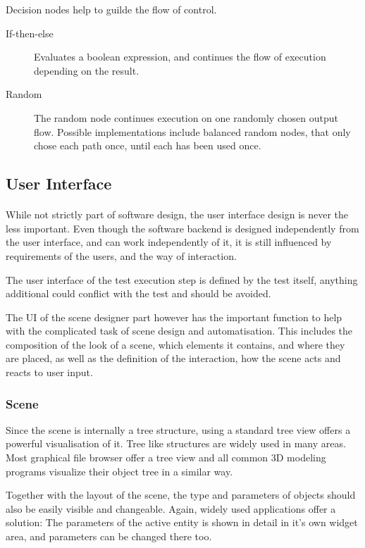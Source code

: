 Decision nodes help to guilde the flow of control.

\begin{description}
\item[If-then-else]
Evaluates a boolean expression, and continues the flow of execution depending on the result.

\item[Random]
The random node continues execution on one randomly chosen output flow.
Possible implementations include balanced random nodes, that only chose each path once, until each has been used once.

\end{description}


\subsection{User Interface}
\paragraph{}
While not strictly part of software design, the user interface design is never the less important\cite{hig}.
Even though the software backend is designed independently from the user interface, and can work independently of it, it is still influenced by requirements of the users, and the way of interaction.

The user interface of the test execution step is defined by the test itself, anything additional could conflict with the test and should be avoided.

The UI of the scene designer part however has the important function to help with the complicated task of scene design and automatisation. This includes the composition of the look of a scene, which elements it contains, and where they are placed, as well as the definition of the interaction, how the scene acts and reacts to user input.

\subsubsection{Scene}
Since the scene is internally a tree structure, using a standard tree view offers a powerful visualisation of it.
Tree like structures are widely used in many areas.
Most graphical file browser offer a tree view and all common 3D modeling programs visualize their object tree in a similar way.

Together with the layout of the scene, the type and parameters of objects should also be easily visible and changeable.
Again, widely used applications offer a solution: The parameters of the active entity is shown in detail in it's own widget area, and parameters can be changed there too.

